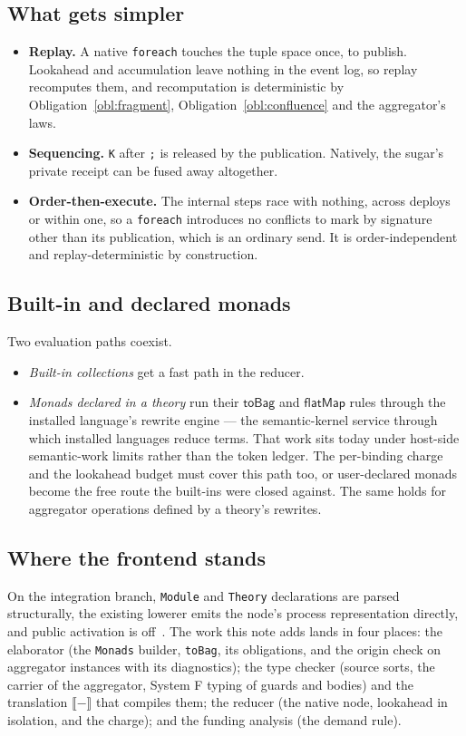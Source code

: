 \documentclass[11pt]{article}
\theoremstyle{branddef}
\theoremstyle{brandplain}
\theoremstyle{brandrem}
\newcommand{\sem}[1]{\llbracket #1 \rrbracket}
\newcommand{\bind}{\mathsf{flatMap}}
\newcommand{\fe}{\texttt{foreach}}
\begin{document}
\subsection{What gets simpler}

\begin{itemize}[nosep]
\item \textbf{Replay.} A native \fe{} touches the tuple space once, to publish.
Lookahead and accumulation leave nothing in the event log, so replay
recomputes them, and recomputation is deterministic by
Obligation~\ref{obl:fragment}, Obligation~\ref{obl:confluence} and the
aggregator's laws.
\item \textbf{Sequencing.} \texttt{K} after \texttt{;} is released by the
publication. Natively, the sugar's private receipt can be fused away
altogether.
\item \textbf{Order-then-execute.} The internal steps race with nothing, across
deploys or within one, so a \fe{} introduces no conflicts to mark by signature
other than its publication, which is an ordinary send. It is order-independent
and replay-deterministic by construction.
\end{itemize}

\subsection{Built-in and declared monads}

Two evaluation paths coexist.
\begin{itemize}[nosep]
\item \emph{Built-in collections} get a fast path in the reducer.
\item \emph{Monads declared in a theory} run their \(\mathsf{toBag}\) and
\(\bind\) rules through the installed language's rewrite engine --- the
semantic-kernel service through which installed languages reduce terms. That
work sits today under host-side semantic-work limits rather than the token
ledger. The per-binding charge and the lookahead budget must cover this path
too, or user-declared monads become the free route the built-ins were closed
against. The same holds for aggregator operations defined by a theory's
rewrites.
\end{itemize}

\subsection{Where the frontend stands}

On the integration branch, \texttt{Module} and \texttt{Theory} declarations are
parsed structurally, the existing lowerer emits the node's process
representation directly, and public activation is off~\cite{f1r3nodeOTE}. The
work this note adds lands in four places: the elaborator (the \texttt{Monads}
builder, \texttt{toBag}, its obligations, and the origin check on aggregator
instances with its diagnostics); the type checker (source sorts, the carrier of
the aggregator, System F typing of guards and bodies) and the translation
\(\sem{-}\) that compiles them; the reducer (the native node,
lookahead in isolation, and the charge); and the funding analysis (the demand
rule).
\end{document}
